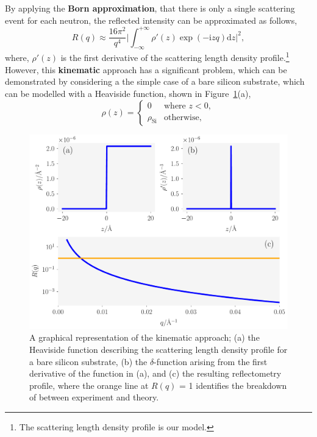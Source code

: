 \documentclass[twoside,symmetric]{tufte-handout}
\begin{document}
By applying the \textbf{Born approximation},\cite{born_quantenmechanik_1926} that there is only a single scattering event for each neutron, the reflected intensity can be approximated as follows,\cite{sivia_elementary_2011}
%
\begin{equation}
    R(q) \approx \frac{16\pi^2}{q^4} \bigg| \int^{+\infty}_{-\infty}{\rho'(z)\exp{(-\mathrm{i} zq) \text{d}z} \bigg|^2},
    \label{equ:kine}
\end{equation}
%
where, $\rho'(z)$ is the first derivative of the scattering length density profile.\footnote{The scattering length density profile is our model.} 
However, this \textbf{kinematic} approach has a significant problem, which can be demonstrated by considering a the simple case of a bare silicon substrate, which can be modelled with a Heaviside function, shown in Figure~\ref{fig:kine}(a), 
%
\begin{equation}
    \rho(z) = 
    \begin{cases}
        0 & \text{where } z < 0,\\
        \rho_{\text{Si}} & \text{otherwise},
    \end{cases}
\end{equation}
%
%
\begin{figure}
    \forceversofloat
    \includegraphics[width=\textwidth]{kine}
    \caption{A graphical representation of the kinematic approach; (a) the Heaviside function describing the scattering length density profile for a bare silicon substrate, (b) the $\delta$-function arising from the first derivative of the function in (a), and (c) the resulting reflectometry profile, where the orange line at $R(q)$ = 1 identifies the breakdown of between experiment and theory.}
    \label{fig:kine}
\end{figure}
\end{document}
